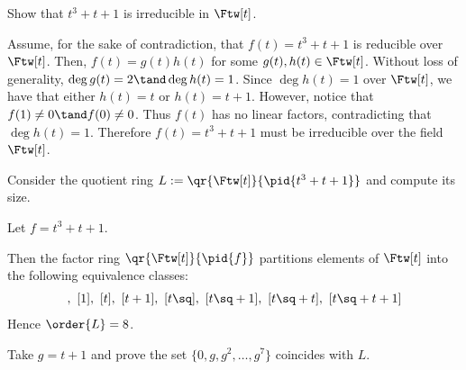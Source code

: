 \documentclass{article}
\begin{document}

\setcounter{section}{3}
\setcounter{exercise}{1}
\begin{subexercise}
Show that \( t^3+t+1 \) is irreducible in \( \Ftw[t] \).
\end{subexercise}

\begin{solution}
Assume, for the sake of contradiction, that \( f(t) = t^3+t+1 \) is reducible over \( \Ftw[t] \).
Then, \( f(t) = g(t)h(t) \) for some \( g(t),h(t)\in \Ftw[t] \).
Without loss of generality, \( \deg g(t) = 2 \tand \deg h(t) = 1 \).
Since \( \deg h(t) = 1 \) over \( \Ftw[t] \), we have that either \( h(t) = t \) or \( h(t) = t+1 \).
However, notice that \( f(1) \neq 0\tand f(0)\neq 0 \).
Thus \( f(t) \) has no linear factors, contradicting that \( \deg h(t) = 1 \).
Therefore \( f(t) = t^3+t+1 \) must be irreducible over the field \( \Ftw[t] \).
\end{solution}

\begin{subexercise}
Consider the quotient ring \( L:= \qr{\Ftw[t]}{\pid{t^3+t+1}} \) and compute its size.
\end{subexercise}

\begin{solution}
Let \( f = t^3+t+1 \).

Then the factor ring \( \qr{\Ftw[t]}{\pid{f}} \) partitions elements of \( \Ftw[t] \) into the following equivalence classes: \begin{align*}
  [0],\ [1],\ [t] ,\ [t+1],\ [t\sq],\ [t\sq+1],\ [t\sq+t],\ [t\sq+t+1]
\end{align*}
Hence \( \order{L} = 8 \).
\end{solution}

\begin{subexercise}
Take \( g=t+1 \) and prove the set \( \{0,g,g^2,\ldots,g^7\} \) coincides with \( L \).
\end{subexercise}
\end{document}
